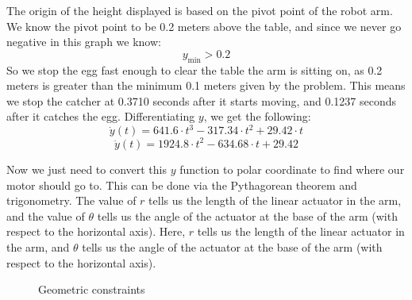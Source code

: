 \documentclass[nofoot,pdf-a,balance,colorlinks,upint,subscriptcorrection,varvw,mathalfa=cal=boondoxo]{asmeconf}
\begin{document}
	The origin of the height displayed is based on the pivot point of the robot arm. We know the pivot point to be 0.2 meters above the table, and since we never go negative in this graph we know:
	\begin{equation}
	y_{\textrm{min}} > 0.2
	\end{equation}
	So we stop the egg fast enough to clear the table the arm is sitting on, as 0.2 meters is greater than the minimum 0.1 meters given by the problem. This means we stop the catcher at 0.3710 seconds after it starts moving, and 0.1237 seconds after it catches the egg.\newline
    Differentiating $y$, we get the following:
    \begin{equation}\label{y_velocity}
        \dot{y}\left(t\right) = 641.6 \cdot t^3 - 317.34 \cdot t^2 + 29.42 \cdot t
    \end{equation}
    \begin{equation}\label{y_acceleration}
        \ddot{y}\left(t\right) = 1924.8 \cdot t^2 - 634.68 \cdot t + 29.42
    \end{equation}


	Now we just need to convert this $y$ function to polar coordinate to find where our motor should go to. This can be done via the Pythagorean theorem and trigonometry. The value of $r$ tells us the length of the linear actuator in the arm, and the value of $\theta$ tells us the angle of the actuator at the base of the arm (with respect to the horizontal axis). Here, $r$ tells us the length of the linear actuator in the arm, and $\theta$ tells us the angle of the actuator at the base of the arm (with respect to the horizontal axis). 

    \begin{figure}[H]
        \centering
        \caption{Geometric constraints}
    \end{figure}
\end{document}
